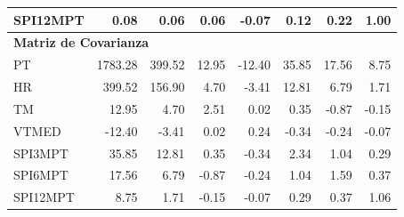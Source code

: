 \begin{table}[ht]
\begin{tabular}{lrrrrrrr}
SPI12MPT & 0.08 & 0.06 & 0.06 & -0.07 & 0.12 & 0.22 & 1.00 \\
\midrule
\multicolumn{8}{l}{\textbf{Matriz de Covarianza}} \\
\midrule
PT       & 1783.28 & 399.52 & 12.95 & -12.40 & 35.85 & 17.56 & 8.75 \\
HR       & 399.52 & 156.90 & 4.70 & -3.41 & 12.81 & 6.79 & 1.71 \\
TM       & 12.95 & 4.70 & 2.51 & 0.02 & 0.35 & -0.87 & -0.15 \\
VTMED    & -12.40 & -3.41 & 0.02 & 0.24 & -0.34 & -0.24 & -0.07 \\
SPI3MPT  & 35.85 & 12.81 & 0.35 & -0.34 & 2.34 & 1.04 & 0.29 \\
SPI6MPT  & 17.56 & 6.79 & -0.87 & -0.24 & 1.04 & 1.59 & 0.37 \\
SPI12MPT & 8.75 & 1.71 & -0.15 & -0.07 & 0.29 & 0.37 & 1.06 \\
\bottomrule
\end{tabular}
\end{table}






